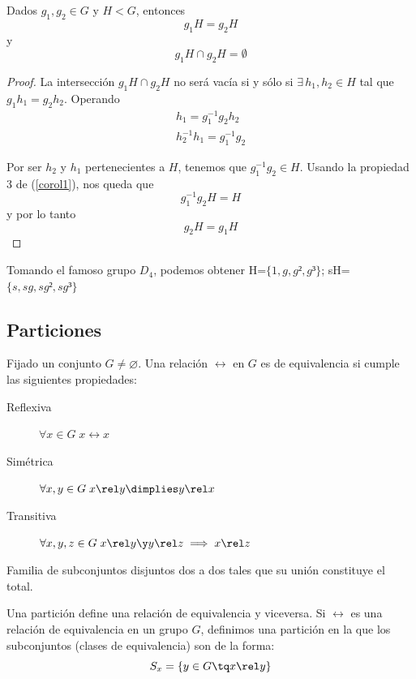 \documentclass[nochap]{apuntes}
\begin{document}
  \begin{prop}
   Dados $g_{1}, g_{2}\in G$ y $H<G$, entonces \[ g_{1}H=g_{2}H \] y \[g_{1}H\cap g_{2}H=\emptyset \]
  \end{prop}
  
  \begin{proof}
   La intersección $g_{1}H\cap g_{2}H$ no será vacía si y sólo si $\exists\, h_{1},h_{2} \in H$ tal que $g_{1}h_{1}=g_{2}h_{2}$. Operando 
   \begin{gather*}
   h_{1}=g_{1}^{-1}g_{2}h_{2} \\
   h_{2}^{-1}h_{1}=g_{1}^{-1}g_{2}
   \end{gather*}
   
   Por ser $h_2$ y $h_1$ pertenecientes a $H$, tenemos que $g_{1}^{-1}g_{2} \in H$. Usando la propiedad 3 de (\ref{corol1}), nos queda que
    \[ g_{1}^{-1}g_{2}H=H  \] y por lo tanto \[ g_{2}H=g_{1}H \]
  \end{proof}
  
  \begin{example}
   Tomando el famoso grupo $D_{4}$, podemos obtener H=$\{1,g,g²,g³\}$; sH=$\{s,sg,sg²,sg³\}$
  \end{example}
  
  
  
  \subsection{Particiones}

  \begin{defn}
   Fijado un conjunto $G\neq\varnothing$. Una relación $\rel$ en $G$ es de equivalencia si cumple las siguientes propiedades:
  
   \begin{description}   
    \item[Reflexiva] $\forall x\in G \;  x\rel x$
    \item[Simétrica] $\forall x,y \in G\;  x\rel y \dimplies y \rel x$
    \item[Transitiva] $\forall x,y,z \in G\;  x\rel y \y  y\rel z \implies x\rel z$
   \end{description}  
  \end{defn}
 
  \begin{defn}[Partición]
   Familia de subconjuntos disjuntos dos a dos tales que su unión constituye el total. 
  \end{defn}
  
  Una partición define una relación de equivalencia y viceversa. Si $\rel$ es una relación de equivalencia en un grupo $G$, 
  definimos una partición en la que los subconjuntos (clases de equivalencia) son de la forma: \[ S_{x}=\{y\in G \tq x\rel y\} \]
  
\end{document}
